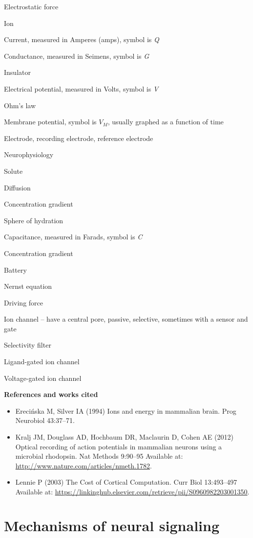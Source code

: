 \documentclass[
]{book}
\begin{document}
Electrostatic force

Ion

Current, measured in Amperes (amps), symbol is \emph{Q}

Conductance, measured in Seimens, symbol is \emph{G}

Insulator

Electrical potential, measured in Volts, symbol is \emph{V}

Ohm's law

Membrane potential, symbol is \(V_{M}\), usually graphed as a function of time

Electrode, recording electrode, reference electrode

Neurophysiology

Solute

Diffusion

Concentration gradient

Sphere of hydration

Capacitance, measured in Farads, symbol is \emph{C}

Concentration gradient

Battery

Nernst equation

Driving force

Ion channel -- have a central pore, passive, selective, sometimes with a sensor and gate

Selectivity filter

Ligand-gated ion channel

Voltage-gated ion channel

\textbf{References and works cited}

\begin{itemize}
\item
  Erecińska M, Silver IA (1994) Ions and energy in mammalian brain. Prog Neurobiol 43:37--71.
\item
  Kralj JM, Douglass AD, Hochbaum DR, Maclaurin D, Cohen AE (2012) Optical recording of action potentials in mammalian neurons using a microbial rhodopsin. Nat Methods 9:90--95 Available at: \url{http://www.nature.com/articles/nmeth.1782}.
\item
  Lennie P (2003) The Cost of Cortical Computation. Curr Biol 13:493--497 Available at: \url{https://linkinghub.elsevier.com/retrieve/pii/S0960982203001350}.
\end{itemize}

\hypertarget{neurophysiology-mechanisms}{%
\section{Mechanisms of neural signaling}\label{neurophysiology-mechanisms}}
\end{document}
